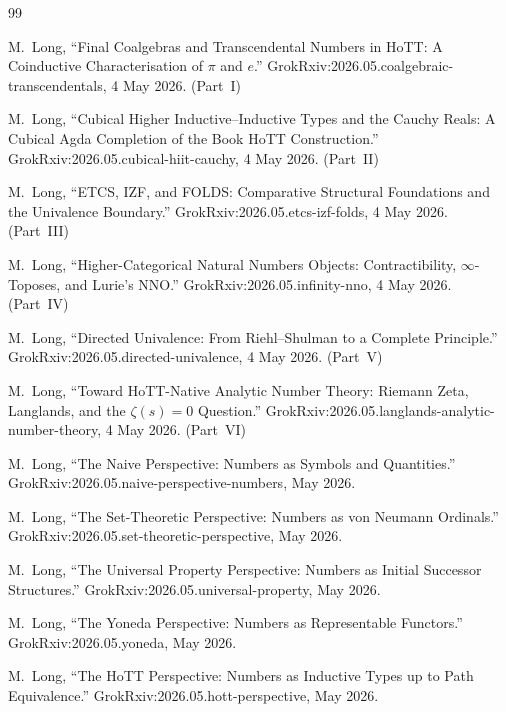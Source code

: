 \documentclass[12pt]{article}
\theoremstyle{definition}
\theoremstyle{remark}
\begin{document}
\begin{thebibliography}{99}
\raggedright


M.\ Long, ``Final Coalgebras and Transcendental Numbers in HoTT: A
Coinductive Characterisation of $\pi$ and $e$.''
GrokRxiv:2026.05.coalgebraic-transcendentals, 4 May 2026. (Part~I)

M.\ Long, ``Cubical Higher Inductive--Inductive Types and the Cauchy
Reals: A Cubical Agda Completion of the Book HoTT Construction.''
GrokRxiv:2026.05.cubical-hiit-cauchy, 4 May 2026. (Part~II)

M.\ Long, ``ETCS, IZF, and FOLDS: Comparative Structural Foundations and
the Univalence Boundary.'' GrokRxiv:2026.05.etcs-izf-folds, 4 May 2026.
(Part~III)

M.\ Long, ``Higher-Categorical Natural Numbers Objects: Contractibility,
$\infty$-Toposes, and Lurie's NNO.''
GrokRxiv:2026.05.infinity-nno, 4 May 2026. (Part~IV)

M.\ Long, ``Directed Univalence: From Riehl--Shulman to a Complete
Principle.''
GrokRxiv:2026.05.directed-univalence, 4 May 2026. (Part~V)

M.\ Long, ``Toward HoTT-Native Analytic Number Theory: Riemann Zeta,
Langlands, and the $\zeta(s) = 0$ Question.''
GrokRxiv:2026.05.langlands-analytic-number-theory, 4 May 2026. (Part~VI)


M.\ Long, ``The Naive Perspective: Numbers as Symbols and Quantities.''
GrokRxiv:2026.05.naive-perspective-numbers, May 2026.

M.\ Long, ``The Set-Theoretic Perspective: Numbers as von Neumann
Ordinals.'' GrokRxiv:2026.05.set-theoretic-perspective, May 2026.

M.\ Long, ``The Universal Property Perspective: Numbers as Initial
Successor Structures.'' GrokRxiv:2026.05.universal-property, May 2026.

M.\ Long, ``The Yoneda Perspective: Numbers as Representable Functors.''
GrokRxiv:2026.05.yoneda, May 2026.

M.\ Long, ``The HoTT Perspective: Numbers as Inductive Types up to Path
Equivalence.'' GrokRxiv:2026.05.hott-perspective, May 2026.


\end{thebibliography}
\end{document}
